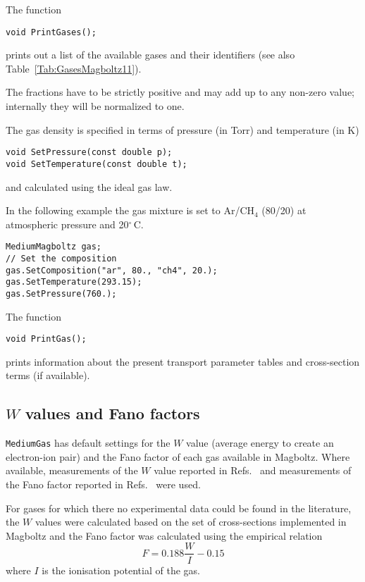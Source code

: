 The function
\begin{lstlisting}
void PrintGases();
\end{lstlisting}
prints out a list of the available gases and their identifiers 
(see also Table~\ref{Tab:GasesMagboltz11}).
 
The fractions have to be strictly positive and 
may add up to any non-zero value; 
internally they will be normalized to one.

The gas density is specified in terms of pressure (in Torr) 
and temperature (in K)
\begin{lstlisting}
void SetPressure(const double p);
void SetTemperature(const double t);
\end{lstlisting}
and calculated using the ideal gas law. 

In the following example the gas mixture is set 
to Ar/CH\(_{4}\) (80/20) at 
atmospheric pressure and 20\(^{\circ}\)\,C.
\begin{lstlisting}
MediumMagboltz gas;
// Set the composition
gas.SetComposition("ar", 80., "ch4", 20.);
gas.SetTemperature(293.15);
gas.SetPressure(760.);
\end{lstlisting}

The function
\begin{lstlisting}
void PrintGas();
\end{lstlisting}
prints information about the present transport parameter tables and 
cross-section terms (if available). 

\subsection{$W$ values and Fano factors}
\texttt{MediumGas} has default settings for the 
$W$ value (average energy to create an electron-ion pair) and 
the Fano factor of each gas available in Magboltz.
Where available, measurements of the $W$ value reported in 
Refs.~\cite{ICRU31,Reinking1986,Pansky1997} and measurements of the Fano factor 
reported in Refs.~\cite{IAEA799,Srdoc1987,Pansky1997} were used. 

For gases for which there no experimental data could be found 
in the literature, the $W$ values were calculated based on the set of 
cross-sections implemented in Magboltz and the Fano factor was calculated 
using the empirical relation \cite{KrajcarBronic1992}
\begin{equation*}
F = 0.188 \frac{W}{I} - 0.15
\end{equation*}
where $I$ is the ionisation potential of the gas.

